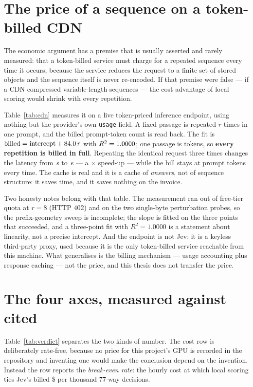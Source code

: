 

\section{The price of a sequence on a token-billed CDN}

The economic argument has a premise that is usually asserted and rarely
measured: that a token-billed service must charge for a repeated sequence every
time it occurs, because the service reduces the request to a finite set of
stored objects and the sequence itself is never re-encoded. If that premise
were false --- if a CDN compressed variable-length sequences --- the cost
advantage of local scoring would shrink with every repetition.

Table~\ref{tab:cdn} measures it on a live token-priced inference endpoint,
using nothing but the provider's own \texttt{usage} field. A fixed passage is
repeated $r$ times in one prompt, and the billed prompt-token count is read
back. The fit is
$\mathrm{billed} = \mathrm{intercept} + 84.0\,r$ with $R^2 = 1.0000$;
one passage is \CdnPassageTokens{} tokens, so \textbf{every repetition is
billed in full}. Repeating the identical request three times changes the
latency from \CdnLatCold\,s to \CdnLatWarm\,s --- a \CdnLatSpeedup$\times$
speed-up --- while the bill stays at \CdnBillTokens{} prompt tokens every
time. The cache is real and it is a cache of \emph{answers}, not of sequence
structure: it saves time, and it saves nothing on the invoice.



Two honesty notes belong with that table. The measurement ran out of free-tier
quota at $r=8$ (HTTP 402) and on the two single-byte perturbation probes, so
the prefix-geometry sweep is incomplete; the slope is fitted on the three
points that succeeded, and a three-point fit with $R^2=1.0000$ is a statement
about linearity, not a precise intercept. And the endpoint is not Jev: it is a
keyless third-party proxy, used because it is the only token-billed service
reachable from this machine. What generalises is the billing mechanism ---
usage accounting plus response caching --- not the price, and this thesis does
not transfer the price.

\section{The four axes, measured against cited}

Table~\ref{tab:verdict} separates the two kinds of number. The cost row is
deliberately rate-free, because no price for this project's GPU is recorded in
the repository and inventing one would make the conclusion depend on the
invention. Instead the row reports the \emph{break-even rate}: the hourly cost
at which local scoring ties Jev's billed \$\CmpBankJevCost{} per thousand
77-way decisions.

